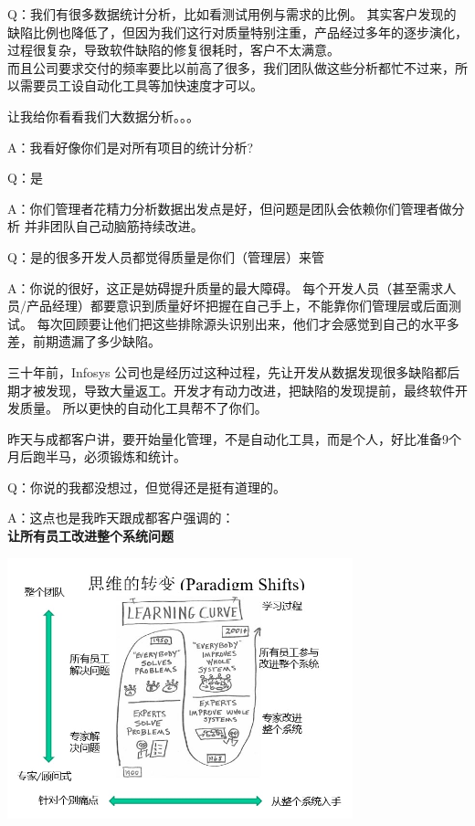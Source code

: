 
Q：我们有很多数据统计分析，比如看测试用例与需求的比例。
其实客户发现的缺陷比例也降低了，但因为我们这行对质量特别注重，产品经过多年的逐步演化，过程很复杂，导致软件缺陷的修复很耗时，客户不太满意。\\
而且公司要求交付的频率要比以前高了很多，我们团队做这些分析都忙不过来，所以需要员工设自动化工具等加快速度才可以。

让我给你看看我们大数据分析。。。

A：我看好像你们是对所有项目的统计分析?

Q：是

A：你们管理者花精力分析数据出发点是好，但问题是团队会依赖你们管理者做分析
并非团队自己动脑筋持续改进。

Q：是的很多开发人员都觉得质量是你们（管理层）来管

A：你说的很好，这正是妨碍提升质量的最大障碍。
每个开发人员（甚至需求人员/产品经理）都要意识到质量好坏把握在自己手上，不能靠你们管理层或后面测试。
每次回顾要让他们把这些排除源头识别出来，他们才会感觉到自己的水平多差，前期遗漏了多少缺陷。

三十年前，Infosys
公司也是经历过这种过程，先让开发从数据发现很多缺陷都后期才被发现，导致大量返工。开发才有动力改进，把缺陷的发现提前，最终软件开发质量。
所以更快的自动化工具帮不了你们。

昨天与成都客户讲，要开始量化管理，不是自动化工具，而是个人，好比准备9个月后跑半马，必须锻炼和统计。

Q：你说的我都没想过，但觉得还是挺有道理的。

A：这点也是我昨天跟成都客户强调的：\\
\textbf{让所有员工改进整个系统问题}

\includegraphics[width=10cm]{ImproveWholeSystemScreenshot_2021-12-27_204408.jpg}

